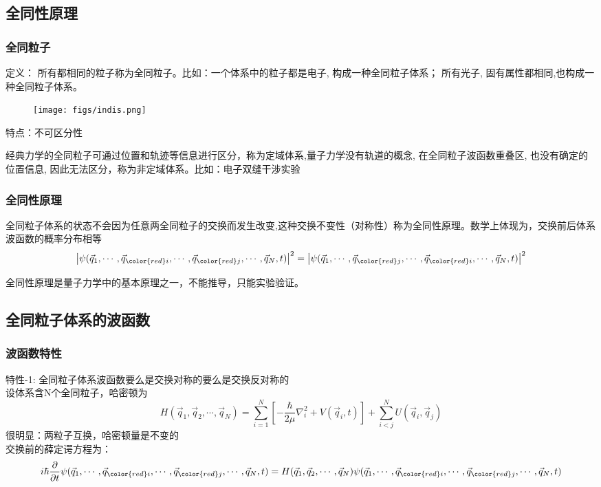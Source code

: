 \subsection{全同性原理}
\begin{frame}[label=current]
  \frametitle{全同粒子}
  \alert{定义：} 所有\emf[固有属性] 都相同的粒子称为全同粒子。比如：一个体系中的粒子都是电子, 构成一种全同粒子体系； 所有光子, 固有属性都相同,也构成一种全同粒子体系。 
\begin{figure}[htbp]
  \centering
  \texttt{[image: figs/indis.png]}
\end{figure}

\alert{特点：不可区分性}

经典力学的全同粒子可通过位置和轨迹等信息进行区分，称为定域体系,量子力学没有轨道的概念, 在全同粒子波函数重叠区, 也没有确定的位置信息, 因此无法区分，称为非定域体系。比如：电子双缝干涉实验 
\end{frame} 

\begin{frame}[label=current]
  \frametitle{全同性原理}
    \begin{atcbox}
      全同粒子体系的状态不会因为任意两全同粒子的交换而发生改变,这种交换不变性（对称性）称为全同性原理。数学上体现为，交换前后体系波函数的概率分布相等
      \[\left\vert\psi(\vec{q}_1,\cdots, \vec{q}_{\color{red}i},\cdots,\vec{q}_{\color{red}j},\cdots,\vec{q}_N,t)\right\vert ^2 = \left\vert\psi(\vec{q}_1,\cdots, \vec{q}_{\color{red}j},\cdots,\vec{q}_{\color{red}i},\cdots,\vec{q}_N,t)\right\vert ^2 \]
    \end{atcbox} 
    全同性原理是量子力学中的基本原理之一，不能推导，只能实验验证。
\end{frame}
 
\subsection{全同粒子体系的波函数}

\begin{frame}[label=current]
  \frametitle{波函数特性}
  \alert{特性-1:} 全同粒子体系波函数要么是交换对称的要么是交换反对称的 \\
\证 设体系含N个全同粒子，哈密顿为
\[ H(\vec{q}_1,\vec{q}_2,\cdots,\vec{q}_N) = \sum_{i=1}^{N}\left[-\frac{\hbar}{2\mu} \nabla^2_i +V(\vec{q}_i , t) \right] + \sum_{i<j}^N U(\vec{q}_i, \vec{q}_j)\]
很明显：两粒子互换，哈密顿量是不变的 \\ 
交换前的薛定谔方程为：
\[i\hbar \frac{\partial }{\partial t} \psi(\vec{q}_1,\cdots, \vec{q}_{\color{red}i},\cdots,\vec{q}_{\color{red}j},\cdots,\vec{q}_N,t)=H(\vec{q}_1,\vec{q}_2,\cdots,\vec{q}_N)\psi(\vec{q}_1,\cdots, \vec{q}_{\color{red}i},\cdots,\vec{q}_{\color{red}j},\cdots,\vec{q}_N,t) \]
\end{frame} 

